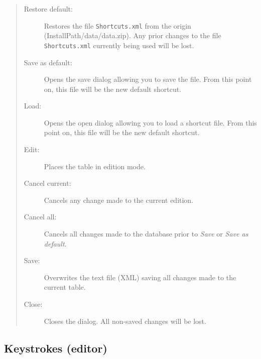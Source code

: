 \begin{quote}
  \begin{footnotesize}
    \begin{description}
      \item[Restore default:]
        Restores the file \texttt{Shortcuts.xml} from the origin
        (InstallPath/data/data.zip). Any prior changes to the file
        \texttt{Shortcuts.xml} currently being used will be lost.
      \item[Save as default:]
        Opens the save dialog allowing you to save the file. From
        this point on, this file will be the new default shortcut.
      \item[Load:]
        Opens the open dialog allowing you to load a shortcut file.
        From this point on, this file will be the new default shortcut.
      \item[Edit:]
        Places the table in edition mode.
      \item[Cancel current:]
        Cancels any change made to the current edition.
      \item[Cancel all:]
        Cancels all changes made to the database prior to \textit{Save} or \textit{Save as default}.
      \item[Save:]
        Overwrites the text file (XML) saving all changes made to the current table.
      \item[Close:]
        Closes the dialog. All non-saved changes will be lost.
    \end{description}
  \end{footnotesize}
\end{quote}

\subsection{Keystrokes (editor)}


